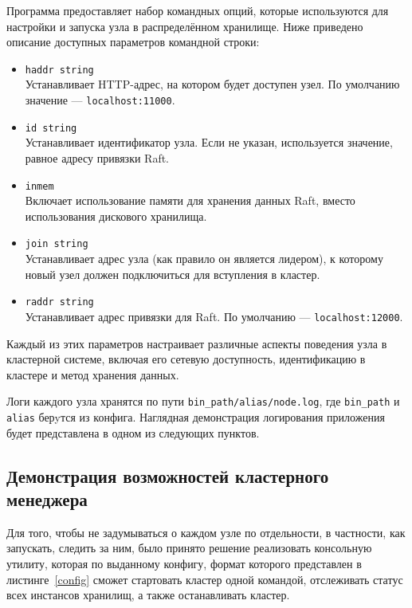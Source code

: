 Программа предоставляет набор командных опций, которые используются для настройки и запуска узла в распределённом хранилище.
Ниже приведено описание доступных параметров командной строки:

\begin{itemize}
    \item \texttt{haddr string} \\
    Устанавливает HTTP-адрес, на котором будет доступен узел. По умолчанию значение — \texttt{localhost:11000}.
    
    \item \texttt{id string} \\
    Устанавливает идентификатор узла. Если не указан, используется значение, равное адресу привязки Raft.
    
    \item \texttt{inmem} \\
    Включает использование памяти для хранения данных Raft, вместо использования дискового хранилища.
    
    \item \texttt{join string} \\
    Устанавливает адрес узла (как правило он является лидером), к которому новый узел должен подключиться для вступления
    в кластер.
    
    \item \texttt{raddr string} \\
    Устанавливает адрес привязки для Raft. По умолчанию — \texttt{localhost:12000}.
\end{itemize}

Каждый из этих параметров настраивает различные аспекты поведения узла в кластерной системе, включая его сетевую доступность,
идентификацию в кластере и метод хранения данных.

Логи каждого узла хранятся по пути \texttt{{bin\_path}/{alias}/node.log}, где \texttt{bin\_path} и \texttt{alias} берyтся из конфига.
Наглядная демонстрация логирования приложения будет представлена в одном из следующих пунктов.

\subsection{Демонстрация возможностей кластерного менеджера}

Для того, чтобы не задумываться о каждом узле по отдельности, в частности, как запускать, следить за ним, было принято решение
реализовать консольную утилиту, которая по выданному конфигу, формат которого представлен в листинге~\ref{config} сможет стартовать
кластер одной командой, отслеживать статус всех инстансов хранилищ, а также останавливать кластер.

